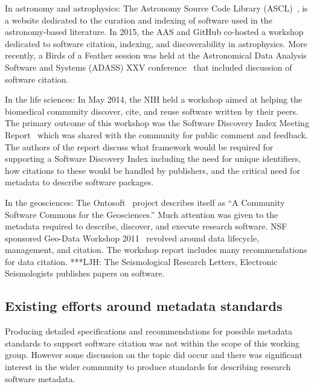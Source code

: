 \documentclass[11pt, oneside]{amsart}
\newcommand{\LJHnote}[1]{ {\textcolor{fuschsia} { ***LJH: #1 }}} %
\begin{document}
In astronomy and astrophysics: The Astronomy Source Code Library
(ASCL)~\cite{ascl}, is a website dedicated to the curation and indexing of
software used in the astronomy-based literature. In 2015, the AAS and GitHub
co-hosted a workshop~\cite{aas-software-index} dedicated to software citation,
indexing, and discoverability in astrophysics. More recently, a Birds of a Feather session was
held at the Astronomical Data Analysis Software and Systems (ADASS) XXV
conference~\cite{2015arXiv151207919A} that included discussion of software
citation.

In the life sciences: In May 2014, the NIH held a workshop aimed at helping the
biomedical community discover, cite, and reuse software written by their peers.
The primary outcome of this workshop was the Software Discovery Index Meeting
Report~\cite{software-discovery-index} which was shared with the community for
public comment and feedback. The authors of the report discuss
what framework would be required for supporting a Software Discovery Index
including the need for unique identifiers, how citations to these would be
handled by publishers, and the critical need for metadata to describe software
packages.

In the geosciences: The Ontosoft~\cite{ontosoft} project describes itself as ``A
Community Software Commons for the Geosciences.'' Much attention was given to the
metadata required to describe, discover, and execute research software. NSF sponsored
Geo-Data Workshop 2011~\cite{nsf-geo-data} revolved around data lifecycle, management, and
citation. The workshop report includes many recommendations for data
citation. \LJHnote{ The Seismological Research Letters, Electronic Seismologists
publishes papers on software.} %

\subsection{Existing efforts around metadata standards}

Producing detailed specifications and recommendations for possible metadata
standards to support software citation was not within the scope of this working
group. However some discussion on the topic did occur and there was significant
interest in the wider community to produce standards for describing research
software metadata.
\end{document}
